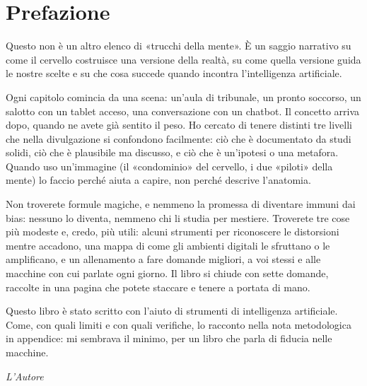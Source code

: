 \chapter*{Prefazione}

Questo non è un altro elenco di «trucchi della mente». È un saggio narrativo su come il cervello costruisce una versione della realtà, su come quella versione guida le nostre scelte e su che cosa succede quando incontra l'intelligenza artificiale.

Ogni capitolo comincia da una scena: un'aula di tribunale, un pronto soccorso, un salotto con un tablet acceso, una conversazione con un chatbot. Il concetto arriva dopo, quando ne avete già sentito il peso. Ho cercato di tenere distinti tre livelli che nella divulgazione si confondono facilmente: ciò che è documentato da studi solidi, ciò che è plausibile ma discusso, e ciò che è un'ipotesi o una metafora. Quando uso un'immagine (il «condominio» del cervello, i due «piloti» della mente) lo faccio perché aiuta a capire, non perché descrive l'anatomia.

Non troverete formule magiche, e nemmeno la promessa di diventare immuni dai bias: nessuno lo diventa, nemmeno chi li studia per mestiere. Troverete tre cose più modeste e, credo, più utili: alcuni strumenti per riconoscere le distorsioni mentre accadono, una mappa di come gli ambienti digitali le sfruttano o le amplificano, e un allenamento a fare domande migliori, a voi stessi e alle macchine con cui parlate ogni giorno. Il libro si chiude con sette domande, raccolte in una pagina che potete staccare e tenere a portata di mano.

Questo libro è stato scritto con l'aiuto di strumenti di intelligenza artificiale. Come, con quali limiti e con quali verifiche, lo racconto nella nota metodologica in appendice: mi sembrava il minimo, per un libro che parla di fiducia nelle macchine.

\vspace{1cm}

\noindent \textit{L'Autore}

